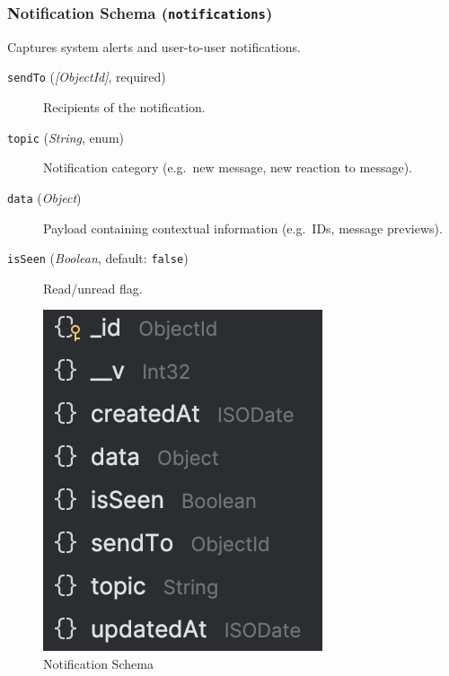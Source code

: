 \subsubsection{Notification Schema (\texttt{notifications})}
Captures system alerts and user-to-user notifications.
\begin{description}
  \item[\texttt{sendTo} (\emph{[ObjectId]}, required)]  
    Recipients of the notification.
  \item[\texttt{topic} (\emph{String}, enum)]  
    Notification category (e.g.\ new message, new reaction to message).
  \item[\texttt{data} (\emph{Object})]  
    Payload containing contextual information (e.g.\ IDs, message previews).
  \item[\texttt{isSeen} (\emph{Boolean}, default: \texttt{false})]  
    Read/unread flag.
\end{description}

\begin{figure}[H]
  \centering
  \includegraphics{notification-schema.png}
  \caption*{Notification Schema}
  \label{fig:notification-schema}
\end{figure}

